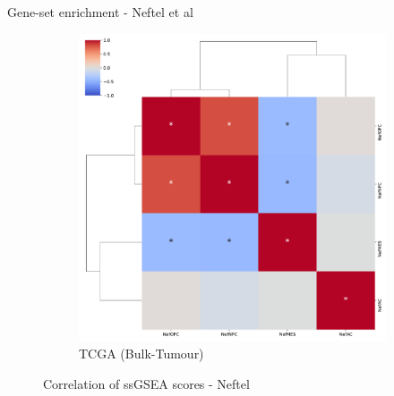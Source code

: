 \documentclass[aspectratio=169,9pt]{beamer}
\begin{document}
\begin{frame}{Gene-set enrichment - Neftel et al}
\begin{adjustwidth}{-5cm}{-5cm}
\begin{figure}
\begin{subfigure}[c]{0.48\textwidth}
                    \includegraphics[width=\textwidth]{ssGSEA_TCGA_corrplot_Nef}
                    \caption{TCGA (Bulk-Tumour)}
                \end{subfigure}
                \caption{Correlation of ssGSEA scores - Neftel}
            \end{figure}
        \end{adjustwidth}
    \end{frame}
\end{document}
